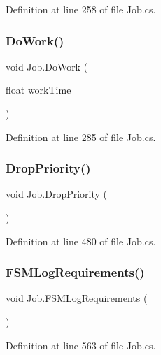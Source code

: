 Definition at line 258 of file Job.\+cs.

\mbox{\label{class_job_a072183f0b0e76cb6dc9839435135b410}} 
\subsubsection{\texorpdfstring{Do\+Work()}{DoWork()}}
{\footnotesize\ttfamily void Job.\+Do\+Work (\begin{DoxyParamCaption}\item[{float}]{work\+Time }\end{DoxyParamCaption})}



Definition at line 285 of file Job.\+cs.

\mbox{\label{class_job_adca382bacf03b82dbdaf6eb8178c97c1}} 
\subsubsection{\texorpdfstring{Drop\+Priority()}{DropPriority()}}
{\footnotesize\ttfamily void Job.\+Drop\+Priority (\begin{DoxyParamCaption}{ }\end{DoxyParamCaption})}



Definition at line 480 of file Job.\+cs.

\mbox{\label{class_job_a4bc970de019bb287e67e3fd9a7098ceb}} 
\subsubsection{\texorpdfstring{F\+S\+M\+Log\+Requirements()}{FSMLogRequirements()}}
{\footnotesize\ttfamily void Job.\+F\+S\+M\+Log\+Requirements (\begin{DoxyParamCaption}{ }\end{DoxyParamCaption})}



Definition at line 563 of file Job.\+cs.

\mbox{\label{class_job_ad4e44203afda2abff6219ec02cc61a9b}} 
